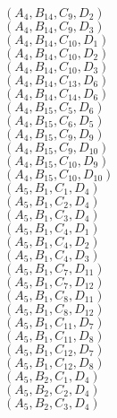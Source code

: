 \documentclass[14pt]{article}
\begin{document}
    $({A}_{4}, {B}_{14}, {C}_{9}, {D}_{2}) $ \\ 
    $({A}_{4}, {B}_{14}, {C}_{9}, {D}_{3}) $ \\ 
    $({A}_{4}, {B}_{14}, {C}_{10}, {D}_{1}) $ \\ 
    $({A}_{4}, {B}_{14}, {C}_{10}, {D}_{2}) $ \\ 
    $({A}_{4}, {B}_{14}, {C}_{10}, {D}_{3}) $ \\ 
    $({A}_{4}, {B}_{14}, {C}_{13}, {D}_{6}) $ \\ 
    $({A}_{4}, {B}_{14}, {C}_{14}, {D}_{6}) $ \\ 
    $({A}_{4}, {B}_{15}, {C}_{5}, {D}_{6}) $ \\ 
    $({A}_{4}, {B}_{15}, {C}_{6}, {D}_{5}) $ \\ 
    $({A}_{4}, {B}_{15}, {C}_{9}, {D}_{9}) $ \\ 
    $({A}_{4}, {B}_{15}, {C}_{9}, {D}_{10}) $ \\ 
    $({A}_{4}, {B}_{15}, {C}_{10}, {D}_{9}) $ \\ 
    $({A}_{4}, {B}_{15}, {C}_{10}, {D}_{10}) $ \\ 
    $({A}_{5}, {B}_{1}, {C}_{1}, {D}_{4}) $ \\ 
    $({A}_{5}, {B}_{1}, {C}_{2}, {D}_{4}) $ \\ 
    $({A}_{5}, {B}_{1}, {C}_{3}, {D}_{4}) $ \\ 
    $({A}_{5}, {B}_{1}, {C}_{4}, {D}_{1}) $ \\ 
    $({A}_{5}, {B}_{1}, {C}_{4}, {D}_{2}) $ \\ 
    $({A}_{5}, {B}_{1}, {C}_{4}, {D}_{3}) $ \\ 
    $({A}_{5}, {B}_{1}, {C}_{7}, {D}_{11}) $ \\ 
    $({A}_{5}, {B}_{1}, {C}_{7}, {D}_{12}) $ \\ 
    $({A}_{5}, {B}_{1}, {C}_{8}, {D}_{11}) $ \\ 
    $({A}_{5}, {B}_{1}, {C}_{8}, {D}_{12}) $ \\ 
    $({A}_{5}, {B}_{1}, {C}_{11}, {D}_{7}) $ \\ 
    $({A}_{5}, {B}_{1}, {C}_{11}, {D}_{8}) $ \\ 
    $({A}_{5}, {B}_{1}, {C}_{12}, {D}_{7}) $ \\ 
    $({A}_{5}, {B}_{1}, {C}_{12}, {D}_{8}) $ \\ 
    $({A}_{5}, {B}_{2}, {C}_{1}, {D}_{4}) $ \\ 
    $({A}_{5}, {B}_{2}, {C}_{2}, {D}_{4}) $ \\ 
    $({A}_{5}, {B}_{2}, {C}_{3}, {D}_{4}) $ \\ 
\end{document}
